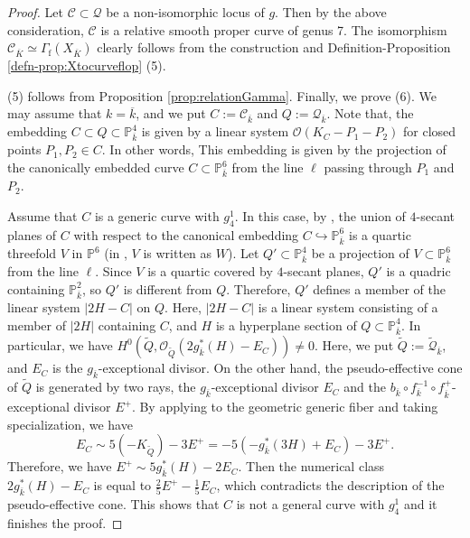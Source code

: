 \documentclass[autodetect-engine, a4paper]{amsart}
\theoremstyle{definition}
\def\P{{\mathbb P}}
\def\cO{\mathcal{O}}
\begin{document}
\begin{proof}
Let $\mathcal{C} \subset \mathcal{Q}$ be a non-isomorphic locus of $g$.
Then by the above consideration, $\mathcal{C}$ is a relative smooth proper curve of genus 7.
The isomorphism $\mathcal{C}_{\overline{K}} \simeq \Gamma_{\mathrm{f}}(X_{\overline{K}})$ clearly follows from the construction and Definition-Proposition \ref{defn-prop:Xtocurveflop} (5).

(5) follows from Proposition \ref{prop:relationGamma}.
Finally, we prove (6).
We may assume that $k=\overline{k}$, and we put $C := \mathcal{C}_{\overline{k}}$ and $Q:=\mathcal{Q}_{\overline{k}}$.
Note that, the embedding $C \subset Q \subset \P_{\overline{k}}^{4}
$
is given by a linear system $\cO(K_{C}-P_{1}-P_{2})$ for closed points $P_{1}, P_{2} \in C$.
In other words, This embedding is given by the projection of the canonically embedded curve $C \subset \P^{6}_{\overline{k}}$ from the line $\ell$ passing through $P_{1}$ and $P_{2}$.

Assume that $C$ is a generic curve with $g_4^1$.
In this case, by \cite[Proposition 6.3]{Mukaicurve}, the union of $4$-secant planes of $C$ with respect to the canonical embedding $C \hookrightarrow \mathbb{P}^{6}_{\overline{k}}$ is a quartic threefold $V$ in $\mathbb{P}^6$ (in \cite[Section 6]{Mukaicurve}, $V$ is written as $W$).
Let $Q' \subset \mathbb{P}^4_{\overline{k}}$ be a projection of $V \subset \mathbb{P}^6_{\overline{k}}$ from the line $\ell$.
Since $V$ is a quartic covered by $4$-secant planes, $Q'$ is a quadric containing $\P^{2}_{\overline{k}}$, so $Q'$ is different from $Q$.
Therefore, $Q'$ defines a member of the linear system $|2H - C|$ on $Q$. Here, $|2H - C|$ is a linear system consisting of a member of $|2H|$ containing $C$, and $H$ is a hyperplane section of $Q \subset \P^4_{\overline{k}}$.
In particular, we have
$H^0 (\widetilde{Q}, \cO_{\widetilde{Q}} (2 g_{\overline{k}}^{\ast}(H)- E_{C})) \neq 0$.
Here, we put $\widetilde{Q} := \widetilde{\mathcal{Q}}_{\overline{k}}$, and $E_{C}$ is the $g_{\overline{k}}$-exceptional divisor.
On the other hand, the pseudo-effective cone of $\widetilde{Q}$ is generated by two rays, the $g_{\overline{k}}$-exceptional divisor $E_{C}$ and the 
$b_{\overline{k}} \circ f_{\overline{k}}^{-1} \circ f^{+}_{\overline{k}}$-exceptional divisor $E^{+}$.
By applying \cite[Theorem 4.4.11]{Iskovskikh-Prokhorov} to the geometric generic fiber and taking specialization, we have
\[
E_{C} \sim 5(-K_{\widetilde{Q}})-3 E^{+} = -5 (-g_{\overline{k}}^{\ast} (3H) + E_{C}) - 3 E^{+}.
\]
Therefore, we have $E^{+} \sim 5 g_{\overline{k}}^{\ast} (H) -2 E_{C}$.
Then the numerical class $2g_{\overline{k}}^{\ast}(H)-E_{C}$ is equal to $\frac{2}{5} E^{+} - \frac{1}{5} E_{C}$, which contradicts the description of the pseudo-effective cone. This shows that $C$ is not a general curve with $g_4^1$ and it finishes the proof.
\end{proof}
\end{document}
